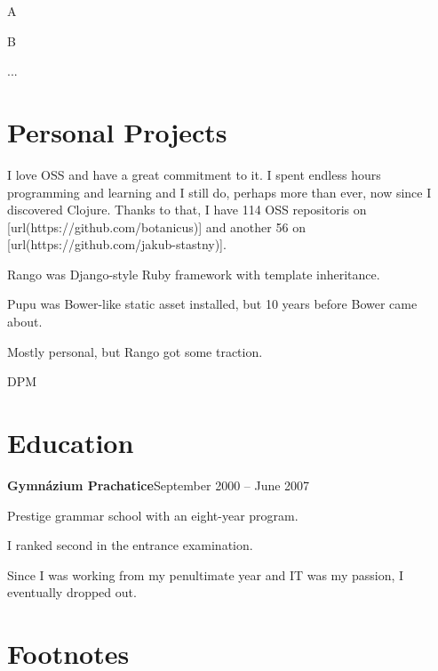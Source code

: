 \startitemize
  \item A
  \item B
  \item ...
\stopitemize

\blank \section{Personal Projects}
I love OSS and have a great commitment to it. I spent endless hours programming and learning and I still do, perhaps more than ever, now since I discovered Clojure. Thanks to that, I have 114 OSS repositoris on [url(https://github.com/botanicus)] and another 56 on [url(https://github.com/jakub-stastny)].


\startitemize
  \item Rango was Django-style Ruby framework with template inheritance.
  \item Pupu was Bower-like static asset installed, but 10 years before Bower came about.
  \item Mostly personal, but Rango got some traction.
\stopitemize

DPM

\section{Education}
\startitemize
  \item {\bf Gymnázium Prachatice}\hfill{September 2000 -- June 2007}
  \startitemize
    \item Prestige grammar school with an eight-year program.
    \item I ranked second in the entrance examination.
    \item Since I was working from my penultimate year and IT was my passion, I eventually dropped out.
  \stopitemize
\stopitemize

\vfill
\section{Footnotes}
\placenotes[endnote][criterium=all] %
